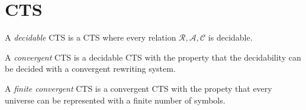 \documentclass[conference]{IEEEtran}
\newcommand{\universo}{\textsc{Universo}}
\begin{document}


\section{CTS}

\begin{definition}
  A \textit{decidable} CTS is a CTS where every relation \(\mathcal{R}, \mathcal{A}, \mathcal{C}\) is decidable.
\end{definition}

\begin{definition}
  A \textit{convergent} CTS is a decidable CTS with the property that the decidability can be decided with a convergent rewriting system.
\end{definition}

\begin{definition}
  A \textit{finite convergent} CTS is a convergent CTS with the propety that every universe can be represented with a finite number of symbols.
\end{definition}
\end{document}
